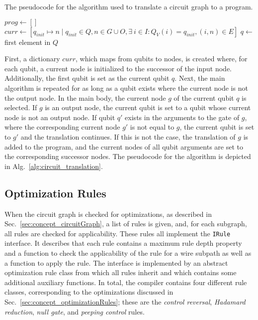 \begin{algorithm}[htb]
    \caption{The pseudocode for the algorithm used to translate a circuit graph to a program.}
    \label{alg:circuit_translation}
    $prog \gets []$\;
    $curr \gets [q_{init} \mapsto n \mid q_{init} \in Q, n \in G \cup O, \exists \ i \in I : Q_V(i) = q_{init}, (i, n) \in E]$\;
    $q \gets$ first element in $Q$\; 
\end{algorithm}

First, a dictionary $curr$, which maps from qubits to nodes, is created where, for each qubit, a current node is initialized to the successor of the input node. Additionally, the first qubit is set as the current qubit $q$. Next, the main algorithm is repeated for as long as a qubit exists where the current node is not the output node. In the main body, the current node $g$ of the current qubit $q$ is selected. If $g$ is an output node, the current qubit is set to a qubit whose current node is not an output node. If qubit $q'$ exists in the arguments to the gate of $g$, where the corresponding current node $g'$ is not equal to $g$, the current qubit is set to $g'$ and the translation continues. If this is not the case, the translation of $g$ is added to the program, and the current nodes of all qubit arguments are set to the corresponding successor nodes. The pseudocode for the algorithm is depicted in Alg.~\ref{alg:circuit_translation}.

\subsection{Optimization Rules}
When the circuit graph is checked for optimizations, as described in Sec.~\ref{sec:concept_circuitGraph}, a list of rules is given, and, for each subgraph, all rules are checked for applicability. These rules all implement the \texttt{IRule} interface. It describes that each rule contains a maximum rule depth property and a function to check the applicability of the rule for a wire subpath as well as a function to apply the rule. The interface is implemented by an abstract optimization rule class from which all rules inherit and which contains some additional auxiliary functions. In total, the compiler contains four different rule classes, corresponding to the optimizations discussed in Sec.~\ref{sec:concept_optimizationRules}; these are the \emph{control reversal}, \emph{Hadamard reduction}, \emph{null gate}, and \emph{peeping control} rules.

